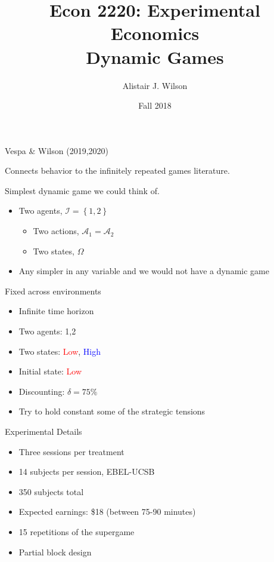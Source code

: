 \documentclass{beamer}
\title{\LARGE Econ 2220: Experimental Economics \\ Dynamic Games}
\author{Alistair J. Wilson }
\date{Fall 2018}
\begin{document}
\maketitle

\begin{frame}{Vespa \& Wilson (2019,2020) }
\begin{card}
Connects behavior to the infinitely repeated
games literature.
\end{card}
\begin{card}
Simplest dynamic game we could think of.

\begin{itemize}
\item Two agents, $\mathcal{I}=\left\{ 1,2\right\} $

\begin{itemize}
\item Two actions, $\mathcal{A}_{1}=\mathcal{A}_{2}$
\item Two states, $\Omega$ \pause
\end{itemize}
\item Any simpler in any variable and we would not have a dynamic game
\end{itemize}
\end{card}
\end{frame}


\begin{frame}{Fixed across environments}
    \begin{card}
    \begin{itemize}
    \item Infinite time horizon
    \item Two agents: 1,2
    \item Two states: \textcolor{red}{Low}, \textcolor{blue}{High}
    \item Initial state: \textcolor{red}{Low}
    \item Discounting: $\delta=75\%$\pause
    \item Try to hold constant some of the strategic tensions
    \end{itemize}
    \end{card}
\end{frame}

\begin{frame}

    \begin{card}{Experimental Details}
    \begin{itemize}
    \item Three sessions per treatment
    \item 14 subjects per session, EBEL-UCSB
    \item 350 subjects total
    \item Expected earnings: \$18 (between 75-90 minutes)
    \item 15 repetitions of the supergame
    \item Partial block design
    \end{itemize}
    \end{card}
\end{frame}
\end{document}
